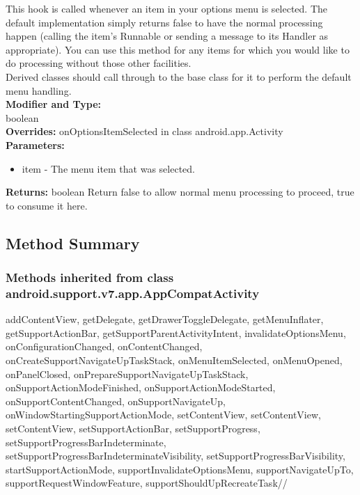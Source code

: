 This hook is called whenever an item in your options menu is selected. The default implementation simply returns false to have the normal processing happen (calling the item's Runnable or sending a message to its Handler as appropriate). You can use this method for any items for which you would like to do processing without those other facilities.\\

Derived classes should call through to the base class for it to perform the default menu handling.\\

\textbf{Modifier and Type:}\\
\tab boolean\\


\textbf{Overrides:}
\tab                onOptionsItemSelected in class android.app.Activity\\

\textbf{Parameters:}
\begin{itemize}
\item item - The menu item that was selected.
\end{itemize}


\textbf{Returns:}
\tab        boolean Return false to allow normal menu processing to proceed, true to consume it here.\\








\subsection{Method Summary}

\subsubsection{Methods inherited from class android.support.v7.app.AppCompatActivity}

addContentView, getDelegate, getDrawerToggleDelegate, getMenuInflater, getSupportActionBar, getSupportParentActivityIntent, invalidateOptionsMenu, onConfigurationChanged, onContentChanged, onCreateSupportNavigateUpTaskStack, onMenuItemSelected, onMenuOpened, onPanelClosed, onPrepareSupportNavigateUpTaskStack, onSupportActionModeFinished, onSupportActionModeStarted, onSupportContentChanged, onSupportNavigateUp, onWindowStartingSupportActionMode, setContentView, setContentView, setContentView, setSupportActionBar, setSupportProgress, setSupportProgressBarIndeterminate, setSupportProgressBarIndeterminateVisibility, setSupportProgressBarVisibility, startSupportActionMode, supportInvalidateOptionsMenu, supportNavigateUpTo, supportRequestWindowFeature, supportShouldUpRecreateTask//


